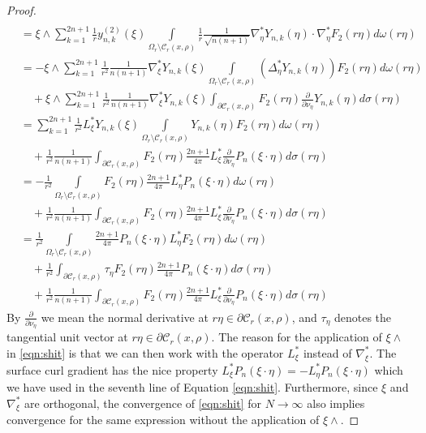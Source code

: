 \documentclass[a4paper, 10pt]{article}
\numberwithin{equation}{section}
\theoremstyle{definition}
\begin{document}
\begin{proof}
\begin{align}
\\&=\xi\wedge\sum_{k=1}^{2n+1}\frac{1}{r}y_{n,k}^{(2)}\left(\xi\right)\nonumber
\int\limits_{\Omega_r\setminus\mathcal{C}_r(x,\rho)}\frac{1}{r}\frac{1}{\sqrt{n(n+1)}}\nabla^*_{\eta}Y_{n,k}\left(\eta\right)\cdot \nabla^*_{\eta}F_2(r\eta)d\omega(r\eta)\nonumber
\\&=-\xi\wedge\sum_{k=1}^{2n+1}\frac{1}{r^2}\frac{1}{{n(n+1)}}\nabla^*_{\xi}Y_{n,k}\left(\xi\right)\int\limits_{\Omega_r\setminus\mathcal{C}_r(x,\rho)}\left(\Delta^*_{\eta}Y_{n,k}\left(\eta\right)\right)F_2(r\eta)d\omega(r\eta)\nonumber
\\&\quad+\xi\wedge\sum_{k=1}^{2n+1}\frac{1}{r^2}\frac{1}{{n(n+1)}}\nabla^*_{\xi}Y_{n,k}\left(\xi\right)\int_{\partial\mathcal{C}_r(x,\rho)}F_2(r\eta)\frac{\partial}{\partial\nu_\eta}Y_{n,k}\left(\eta\right)d\sigma(r\eta)\nonumber
%
\\&=\sum_{k=1}^{2n+1}\frac{1}{r^2}L^*_{\xi}Y_{n,k}\left(\xi\right)\int\limits_{\Omega_r\setminus\mathcal{C}_r(x,\rho)}Y_{n,k}\left(\eta\right)F_2(r\eta)d\omega(r\eta)\nonumber
\\&\quad+\frac{1}{r^2}\frac{1}{{ n(n+1)}}\int_{\partial\mathcal{C}_r(x,\rho)}F_2(r\eta)\frac{2n+1}{{4\pi}}L^*_{\xi}\frac{\partial}{\partial\nu_\eta}P_{n}\left(\xi\cdot\eta\right)d\sigma(r\eta)\nonumber
\\&=-\frac{1}{r^2}\int\limits_{\Omega_r\setminus\mathcal{C}_r(x,\rho)}F_2(r\eta)\frac{2n+1}{4\pi}L_{\eta}^*P_n\left(\xi\cdot\eta\right)d\omega(r\eta)\nonumber
\\&\quad+\frac{1}{r^2}\frac{1}{{ n(n+1)}}\int_{\partial\mathcal{C}_r(x,\rho)}F_2(r\eta)\frac{2n+1}{{4\pi}}L^*_{\xi}\frac{\partial}{\partial\nu_\eta}P_{n}\left(\xi\cdot\eta\right)d\sigma(r\eta)\nonumber
\\&=\frac{1}{r^2}\int\limits_{\Omega_r\setminus\mathcal{C}_r(x,\rho)}\frac{2n+1}{4\pi}P_n\left(\xi\cdot\eta\right)L_{\eta}^*F_2(r\eta)d\omega(r\eta)\nonumber
\\&\quad+\frac{1}{r^2}\int_{\partial\mathcal{C}_r(x,\rho)}\tau_{\eta}F_2(r\eta)\frac{2n+1}{{4\pi}}P_{n}\left(\xi\cdot\eta\right)d\sigma(r\eta)\nonumber
\\&\quad+\frac{1}{r^2}\frac{1}{{ n(n+1)}}\int_{\partial\mathcal{C}_r(x,\rho)}F_2(r\eta)\frac{2n+1}{{4\pi}}L^*_{\xi}\frac{\partial}{\partial\nu_\eta}P_{n}\left(\xi\cdot\eta\right)d\sigma(r\eta)\nonumber
\end{align}\normalsize
By $\frac{\partial}{\partial\nu_\eta}$ we mean the normal derivative at $r\eta\in\partial\mathcal{C}_r(x,\rho)$, and $\tau_\eta$ denotes the tangential unit vector at $r\eta\in\partial\mathcal{C}_r(x,\rho)$. The reason for the application of $\xi\wedge$ in \eqref{eqn:shit} is that we can then work with the operator $L_{\xi}^*$ instead of $\nabla_\xi ^*$. The surface curl gradient has the nice property $L_{\xi}^*P_{n}\left(\xi\cdot\eta\right)=-L_{\eta}^*P_{n}\left(\xi\cdot\eta\right)$ which we have used in the seventh line of Equation \eqref{eqn:shit}. Furthermore, since $\xi$ and $\nabla_{\xi}^*$ are orthogonal, the convergence of \eqref{eqn:shit} for $N\to \infty$ also implies convergence for the same expression without the application of  $\xi\wedge$. 

\end{proof}
\end{document}
